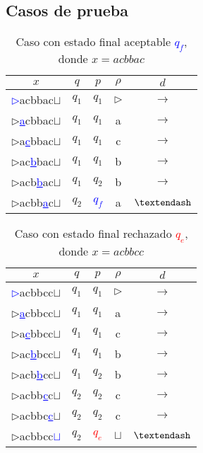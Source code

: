 \documentclass[letterpaper,11pt]{article}
\begin{document}
\subsection{Casos de prueba}

\begin{table}[h!]
\centering
\begin{tabular}{c|c|c|c|c}
\hline
$x$ & $q$ & $p$ & $\rho$ & $d$ \\ \hline
\textcolor{blue}{\underline{$\rhd$}}acbbac$\sqcup$  & $q_1$ & $q_1$ & $\rhd$ & $\rightarrow$  \\
$\rhd$\textcolor{blue}{\underline{a}}cbbac$\sqcup$  & $q_1$ & $q_1$ & a & $\rightarrow$  \\
$\rhd$a\textcolor{blue}{\underline{c}}bbac$\sqcup$  & $q_1$ & $q_1$ & c & $\rightarrow$  \\
$\rhd$ac\textcolor{blue}{\underline{b}}bac$\sqcup$  & $q_1$ & $q_1$ & b & $\rightarrow$  \\
$\rhd$acb\textcolor{blue}{\underline{b}}ac$\sqcup$  & $q_1$ & $q_2$ & b & $\rightarrow$  \\
$\rhd$acbb\textcolor{blue}{\underline{a}}c$\sqcup$  & $q_2$ & \textcolor{blue}{$q_f$} & a & $\textendash$  \\\hline
\end{tabular}
\caption{Caso con estado final aceptable \textcolor{blue}{$q_f$}, donde $x=acbbac$}
\end{table}

\begin{table}[h!]
\centering
\begin{tabular}{c|c|c|c|c}
\hline
$x$ & $q$ & $p$ & $\rho$ & $d$ \\ \hline
\textcolor{blue}{\underline{$\rhd$}}acbbcc$\sqcup$  & $q_1$ & $q_1$ & $\rhd$ & $\rightarrow$  \\
$\rhd$\textcolor{blue}{\underline{a}}cbbcc$\sqcup$  & $q_1$ & $q_1$ & a & $\rightarrow$  \\
$\rhd$a\textcolor{blue}{\underline{c}}bbcc$\sqcup$  & $q_1$ & $q_1$ & c & $\rightarrow$  \\
$\rhd$ac\textcolor{blue}{\underline{b}}bcc$\sqcup$  & $q_1$ & $q_1$ & b & $\rightarrow$  \\
$\rhd$acb\textcolor{blue}{\underline{b}}cc$\sqcup$  & $q_1$ & $q_2$ & b & $\rightarrow$  \\
$\rhd$acbb\textcolor{blue}{\underline{c}}c$\sqcup$  & $q_2$ & $q_2$ & c & $\rightarrow$  \\
$\rhd$acbbc\textcolor{blue}{\underline{c}}$\sqcup$  & $q_2$ & $q_2$ & c & $\rightarrow$  \\
$\rhd$acbbcc\textcolor{blue}{\underline{$\sqcup$}}  & $q_2$ & \textcolor{red}{$q_e$} & $\sqcup$ & $\textendash$  \\\hline
\end{tabular}
\caption{Caso con estado final rechazado \textcolor{red}{$q_e$}, donde $x=acbbcc$}
\end{table}
\end{document}
